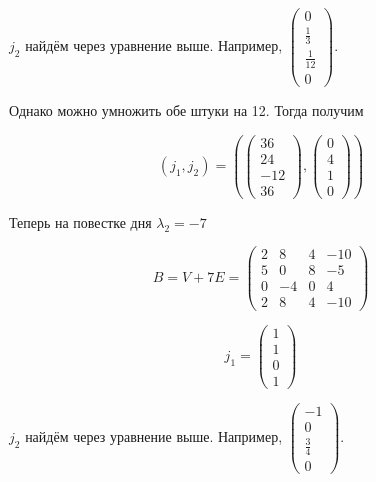 \documentclass[12pt, a4paper]{article}
\begin{document}
    $j_2$ найдём через уравнение выше. Например, $\left(\begin{matrix}
        0 \\
        \frac{1}{3} \\
        \frac{1}{12} \\
        0
        \end{matrix}\right)$.

    Однако можно умножить обе штуки на 12. Тогда получим 

    \begin{equation}
        (j_1, j_2) = \left( \left(\begin{matrix}
            36 \\
            24 \\
            -12 \\
            36
        \end{matrix}\right), \left(\begin{matrix}
            0 \\
            4 \\
            1 \\
            0
        \end{matrix}\right) \right)
    \end{equation}

    Теперь на повестке дня $\lambda_2 = -7$

    \begin{equation}
        B = V + 7E = \left(\begin{matrix}
            2 & 8 & 4 & -10 \\
            5 & 0 & 8 & -5 \\
            0 & -4 & 0 & 4 \\
            2 & 8 & 4 & -10
        \end{matrix}\right)
    \end{equation}

    \begin{equation}
        j_1 = \begin{pmatrix}
            1 \\ 1 \\ 0 \\ 1
        \end{pmatrix}
    \end{equation}
    
    $j_2$ найдём через уравнение выше. Например, $\left(\begin{matrix}
        -1 \\
        0 \\
        \frac{3}{4} \\
        0
        \end{matrix}\right)$.
\end{document}
